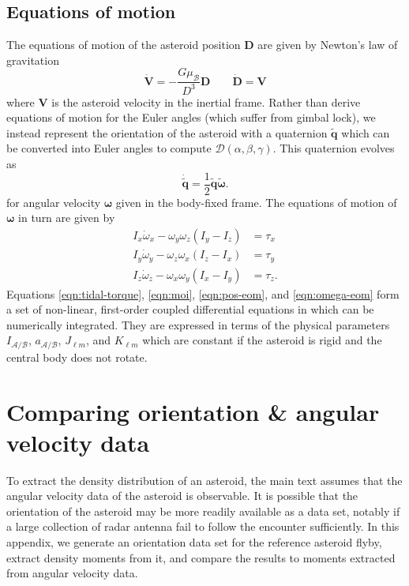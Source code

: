 \documentclass[fleqn,usenatbib]{mnras}
\newcommand{\quat}[1]{\widetilde{\bm{#1}}}
\begin{document}
\subsection{Equations of motion}
\label{sec:eom}


The equations of motion of the asteroid position $\bm D$ are given by Newton's law of gravitation
\begin{equation}
  \dot{\bm V} = -\frac{G \mu_\mathcal{B}}{D^3} \bm D \qquad \dot{\bm D} = \bm V
  \label{eqn:pos-eom}
\end{equation}
where $\bm V$ is the asteroid velocity in the inertial frame. Rather than derive equations of motion for the Euler angles (which suffer from gimbal lock), we instead represent the orientation of the asteroid with a quaternion $\quat q$ which can be converted into Euler angles to compute $\mathcal{D}(\alpha, \beta, \gamma)$. This quaternion evolves as 
\begin{equation}
  \dot{\quat q} = \frac{1}{2}\quat q\quat \omega.
  \label{eqn:quat-eom}
\end{equation}
for angular velocity $\bm \omega$ given in the body-fixed frame. The equations of motion of $\bm \omega$ in turn are given by
\begin{equation}
  \begin{split}
    I_x \dot \omega_x - \omega_y \omega_z (I_y - I_z) &= \tau_x\\
    I_y \dot \omega_y - \omega_z \omega_x (I_z - I_x) &= \tau_y\\
    I_z \dot \omega_z - \omega_x \omega_y (I_x - I_y) &= \tau_z.
  \end{split}
  \label{eqn:omega-eom}
\end{equation}
Equations \ref{eqn:tidal-torque}, \ref{eqn:moi}, \ref{eqn:pos-eom}, and \ref{eqn:omega-eom} form a set of non-linear, first-order coupled differential equations in which can be numerically integrated. They are expressed in terms of the physical parameters $I_\mathcal{A/B}$, $a_\mathcal{A/B}$, $J_{\ell m}$, and $K_{\ell m}$ which are constant if the asteroid is rigid and the central body does not rotate.






\section{Comparing orientation \& angular velocity data}
\label{app:orientation}

To extract the density distribution of an asteroid, the main text assumes that the angular velocity data of the asteroid is observable. It is possible that the orientation of the asteroid may be more readily available as a data set, notably if a large collection of radar antenna fail to follow the encounter sufficiently. In this appendix, we generate an orientation data set for the reference asteroid flyby, extract density moments from it, and compare the results to moments extracted from angular velocity data.
\end{document}

